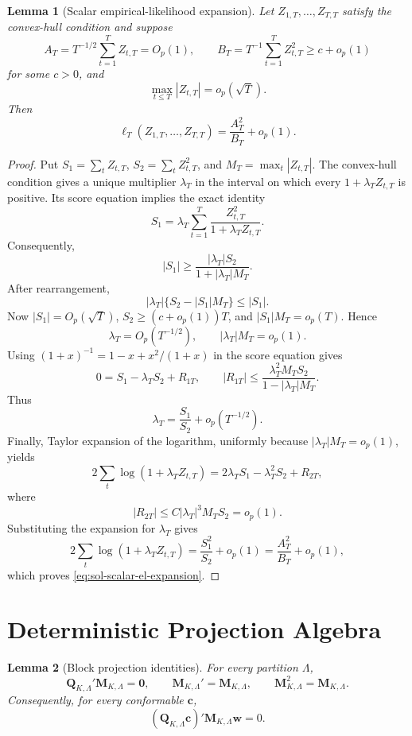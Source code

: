 \documentclass[12pt]{article}
\numberwithin{equation}{section}
\newtheorem{lemma}{Lemma}
\theoremstyle{definition}
\begin{document}
\begin{lemma}[Scalar empirical-likelihood expansion]
\label{lem:sol-scalar-el}
Let \(Z_{1,T},\ldots,Z_{T,T}\) satisfy the convex-hull condition and suppose
\[
    A_T=T^{-1/2}\sum_{t=1}^TZ_{t,T}=O_p(1),
    \qquad
    B_T=T^{-1}\sum_{t=1}^TZ_{t,T}^2\geq c+o_p(1)
\]
for some \(c>0\), and
\[
    \max_{t\leq T}|Z_{t,T}|=o_p(\sqrt T).
\]
Then
\begin{equation}
    \ell_T(Z_{1,T},\ldots,Z_{T,T})
    =\frac{A_T^2}{B_T}+o_p(1).
    \label{eq:sol-scalar-el-expansion}
\end{equation}
\end{lemma}

\begin{proof}
Put
\(S_1=\sum_tZ_{t,T}\), \(S_2=\sum_tZ_{t,T}^2\), and
\(M_T=\max_t|Z_{t,T}|\).  The convex-hull condition gives a unique multiplier
\(\lambda_T\) in the interval on which every \(1+\lambda_TZ_{t,T}\) is
positive.  Its score equation implies the exact identity
\[
    S_1
    =\lambda_T\sum_{t=1}^T
      \frac{Z_{t,T}^2}{1+\lambda_TZ_{t,T}}.
\]
Consequently,
\[
    |S_1|
    \geq
    \frac{|\lambda_T|S_2}{1+|\lambda_T|M_T}.
\]
After rearrangement,
\[
    |\lambda_T|\{S_2-|S_1|M_T\}\leq |S_1|.
\]
Now \(|S_1|=O_p(\sqrt T)\), \(S_2\geq(c+o_p(1))T\), and
\(|S_1|M_T=o_p(T)\).  Hence
\[
    \lambda_T=O_p(T^{-1/2}),
    \qquad
    |\lambda_T|M_T=o_p(1).
\]
Using \((1+x)^{-1}=1-x+x^2/(1+x)\) in the score equation gives
\[
    0=S_1-\lambda_TS_2+R_{1T},
    \qquad
    |R_{1T}|
    \leq
    \frac{\lambda_T^2M_TS_2}{1-|\lambda_T|M_T}.
\]
Thus
\[
    \lambda_T=\frac{S_1}{S_2}+o_p(T^{-1/2}).
\]
Finally, Taylor expansion of the logarithm, uniformly because
\(|\lambda_T|M_T=o_p(1)\), yields
\[
    2\sum_t\log(1+\lambda_TZ_{t,T})
    =2\lambda_TS_1-\lambda_T^2S_2+R_{2T},
\]
where
\[
    |R_{2T}|
    \leq C|\lambda_T|^3M_TS_2=o_p(1).
\]
Substituting the expansion for \(\lambda_T\) gives
\[
    2\sum_t\log(1+\lambda_TZ_{t,T})
    =\frac{S_1^2}{S_2}+o_p(1)
    =\frac{A_T^2}{B_T}+o_p(1),
\]
which proves \eqref{eq:sol-scalar-el-expansion}.
\end{proof}

\section{Deterministic Projection Algebra}

\begin{lemma}[Block projection identities]
\label{lem:wb-projection}
For every partition \(\Lambda\),
\[
    \bm Q_{K,\Lambda}'\bm M_{K,\Lambda}=\bm0,
    \qquad
    \bm M_{K,\Lambda}'=\bm M_{K,\Lambda},
    \qquad
    \bm M_{K,\Lambda}^2=\bm M_{K,\Lambda}.
\]
Consequently, for every conformable \(\bm c\),
\[
    (\bm Q_{K,\Lambda}\bm c)'\bm M_{K,\Lambda}\bm w=0.
\]
\end{lemma}
\end{document}
